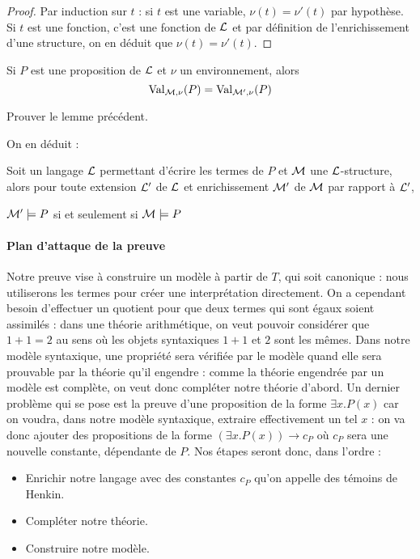 \begin{proof}
    Par induction sur $t$ : si $t$ est une variable, $\nu(t)=\nu'(t)$ par hypothèse. Si $t$ est une fonction, c'est une fonction de $\mathcal L$ et par définition de l'enrichissement d'une structure, on en déduit que $\nu(t)=\nu'(t)$.
\end{proof}

\begin{lem}
    Si $P$ est une proposition de $\mathcal L$ et $\nu$ un environnement, alors $$\mathrm{Val}_{\mathcal M,\nu}(P)=\mathrm{Val}_{\mathcal M',\nu}(P)$$
\end{lem}

\begin{exo}
    Prouver le lemme précédent.
\end{exo}

On en déduit :

\begin{prop}
    Soit un langage $\mathcal L$ permettant d'écrire les termes de $P$ et $\mathcal M$ une $\mathcal L$-structure, alors pour toute extension $\mathcal L'$ de $\mathcal L$ et enrichissement $\mathcal M'$ de $\mathcal M$ par rapport à $\mathcal L'$, \begin{center}
        $\mathcal M'\models P$ si et seulement si $\mathcal M\models P$
    \end{center}
\end{prop}

\paragraph{Plan d'attaque de la preuve}


Notre preuve vise à construire un modèle à partir de $T$, qui soit \og canonique\fg{} : nous utiliserons les termes pour créer une interprétation directement. On a cependant besoin d'effectuer un quotient pour que deux termes qui sont égaux soient assimilés : dans une théorie arithmétique, on veut pouvoir considérer que $1+1=2$ au sens où les objets syntaxiques $1+1$ et $2$ sont les mêmes. Dans notre modèle syntaxique, une propriété sera vérifiée par le modèle quand elle sera prouvable par la théorie qu'il engendre : comme la théorie engendrée par un modèle est complète, on veut donc compléter notre théorie d'abord. Un dernier problème qui se pose est la preuve d'une proposition de la forme $\exists x.P(x)$ car on voudra, dans notre modèle syntaxique, extraire effectivement un tel $x$ : on va donc ajouter des propositions de la forme $(\exists x.P(x))\to c_P$ où $c_P$ sera une nouvelle constante, dépendante de $P$. Nos étapes seront donc, dans l'ordre :
\begin{itemize}[label=$\bullet$]
    \item Enrichir notre langage avec des constantes $c_P$ qu'on appelle des témoins de Henkin.
    \item Compléter notre théorie.
    \item Construire notre modèle.
\end{itemize}

